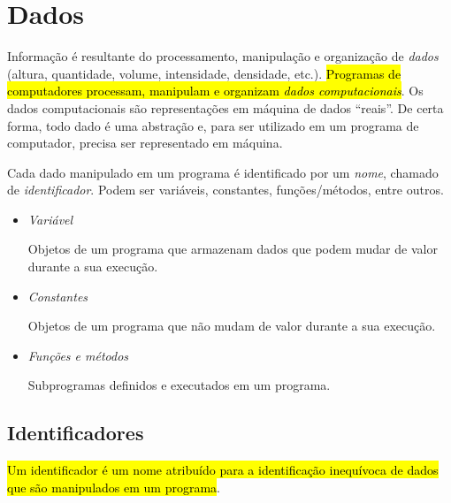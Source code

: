 \section{Dados}\label{cap_lingua_sec_dados}

Informação é resultante do processamento, manipulação e organização de \emph{dados} (altura, quantidade, volume, intensidade, densidade, etc.). \hl{Programas de computadores processam, manipulam e organizam \emph{dados computacionais}}. Os dados computacionais são representações em máquina de dados ``reais''. De certa forma, todo dado é uma abstração e, para ser utilizado em um programa de computador, precisa ser representado em máquina.

Cada dado manipulado em um programa é identificado por um \emph{nome}, chamado de \emph{identificador}. Podem ser variáveis, constantes, funções/métodos, entre outros.
\begin{itemize}
\item \emph{Variável}

  Objetos de um programa que armazenam dados que podem mudar de valor durante a sua execução.

\item \emph{Constantes}

  Objetos de um programa que não mudam de valor durante a sua execução.

\item \emph{Funções e métodos}

  Subprogramas definidos e executados em um programa.
\end{itemize}

\subsection{Identificadores}

\hl{Um identificador é um nome atribuído para a identificação inequívoca de dados que são manipulados em um programa}.

